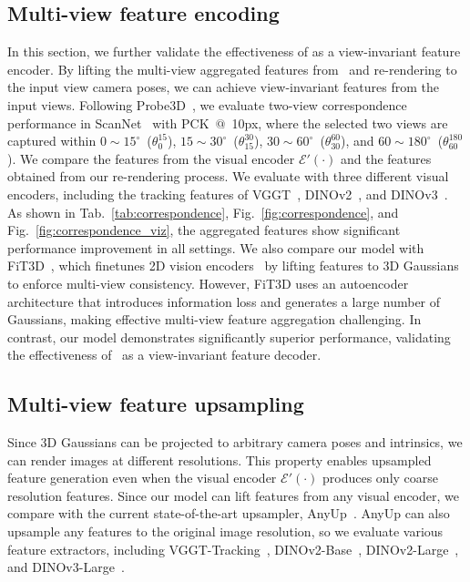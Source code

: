 \subsection{Multi-view feature encoding}
In this section, we further validate the effectiveness of \mbox{\oursF} as a view-invariant feature encoder. By lifting the multi-view aggregated features from \oursF\ and re-rendering to the input view camera poses, we can achieve view-invariant features from the input views. Following Probe3D~\cite{el2024probing}, we evaluate two-view correspondence performance in ScanNet~\cite{dai2017scannet} with \mbox{PCK $@$ 10px}, where the selected two views are captured within $0{\sim}15^\circ$~($\theta_0^{15}$), $15{\sim}30^\circ$~($\theta_{15}^{30}$), $30{\sim}60^\circ$~($\theta_{30}^{60}$), and $60{\sim}180^\circ$~($\theta_{60}^{180}$). We compare the features from the visual encoder $\mathcal{E}'(\cdot)$ and the features obtained from our re-rendering process. We evaluate with three different visual encoders, including the tracking features of VGGT~\cite{wang2025vggt}, DINOv2~\cite{oquab2023dinov2}, and DINOv3~\cite{simeoni2025dinov3}. As shown in Tab.~\ref{tab:correspondence}, Fig.~\ref{fig:correspondence}, and Fig.~\ref{fig:correspondence_viz}, the aggregated features show significant performance improvement in all settings. 
We also compare our model with FiT3D~\cite{yue2024improving}, which finetunes 2D vision encoders~\cite{oquab2023dinov2, du2023learning} by lifting features to 3D Gaussians to enforce multi-view consistency. However, FiT3D uses an autoencoder architecture that introduces information loss and generates a large number of Gaussians, making effective multi-view feature aggregation challenging. In contrast, our model demonstrates significantly superior performance, validating the effectiveness of \oursF\ as a view-invariant feature decoder.



\subsection{Multi-view feature upsampling}
Since 3D Gaussians can be projected to arbitrary camera poses and intrinsics, we can render images at different resolutions. This property enables upsampled feature generation even when the visual encoder $\mathcal{E}'(\cdot)$ produces only coarse resolution features. Since our model can lift features from any visual encoder, we compare with the current state-of-the-art upsampler, AnyUp~\cite{wimmer2025anyup}. AnyUp can also upsample any features to the original image resolution, so we evaluate various feature extractors, including VGGT-Tracking~\cite{wang2025vggt}, DINOv2-Base~\cite{oquab2023dinov2}, DINOv2-Large~\cite{oquab2023dinov2}, and DINOv3-Large~\cite{fan2024large}. 

